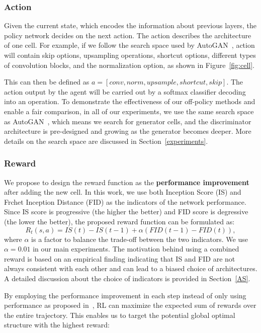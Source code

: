 \documentclass[runningheads]{llncs}
\begin{document}
\subsubsection{Action}
Given the current state, which encodes the information about previous layers, the policy network decides on the next action. The action describes the architecture of one cell. For example, if we follow the search space used by AutoGAN~\cite{gong2019autogan}, action will contain skip options, upsampling operations, shortcut options, different types of convolution blocks, and the normalization option, as shown in Figure~\ref{fig:cell}. 

This can then be defined as $a=[conv,norm,upsample,shortcut,skip]$. The action output by the agent will be carried out by a softmax classifier decoding into an operation. To demonstrate the effectiveness of our off-policy methods and enable a fair comparison,  in all of our experiments, we use the same search space as AutoGAN~\cite{gong2019autogan}, which means we search for generator cells, and the discriminator architecture  is pre-designed and growing as the generator becomes deeper.  More details on the search space are discussed in Section~\ref{experiments}. 
\subsubsection{Reward}
We propose to design the reward function as the \textbf{performance improvement} after adding the new cell. In this work, we use both Inception Score (IS) and Frchet Inception Distance (FID) as the indicators of the network performance. Since IS score is progressive (the higher the better) and FID score is degressive (the lower the better), the  proposed reward function can be formulated as:
\begin{equation}
    R_t(s,a) = IS(t)-IS(t-1) + \alpha(FID(t-1)-FID(t)),
\end{equation}
where $\alpha$ is a factor to balance the trade-off between the two indicators. We use $\alpha=0.01$ in our main experiments. The motivation behind using a combined reward is based on an empirical finding indicating that IS and FID are not always consistent with each other and can lead to a biased choice of architectures. A detailed discussion about the choice of indicators is provided in Section~\ref{AS}.

By employing the performance improvement in each step instead of only using performance as proposed in~\cite{gong2019autogan}, RL can maximize the expected sum of rewards over the entire trajectory. This enables us to target the potential global optimal structure with the highest reward:
\end{document}
